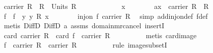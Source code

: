 \begin{isabellebody}
\ {\isachardoublequoteopen}carrier\ R\ {\isacharminus}{\kern0pt}\ {\isacharbraceleft}{\kern0pt}{\isasymzero}\isactrlbsub R\isactrlesub {\isacharbraceright}{\kern0pt}\ {\isasymsubseteq}\ Units\ R{\isachardoublequoteclose}\isanewline
\ \ \ \ \isamarkupfalse%
\isanewline
\ \ \ \ \ \ \isamarkupfalse%
\ x\isanewline
\ \ \ \ \ \ \isamarkupfalse%
\ a{\isacharcolon}{\kern0pt}{\isachardoublequoteopen}x\ {\isasymin}\ carrier\ R\ {\isacharminus}{\kern0pt}\ {\isacharbraceleft}{\kern0pt}{\isasymzero}\isactrlbsub R\isactrlesub {\isacharbraceright}{\kern0pt}{\isachardoublequoteclose}\isanewline
\ \ \ \ \ \ \isamarkupfalse%
\ f\ \ {\isachardoublequoteopen}f\ {\isacharequal}{\kern0pt}\ {\isacharparenleft}{\kern0pt}{\isasymlambda}y{\isachardot}{\kern0pt}\ y\ {\isasymotimes}\isactrlbsub R\isactrlesub \ x{\isacharparenright}{\kern0pt}{\isachardoublequoteclose}\isanewline
\ \ \ \ \ \ \isamarkupfalse%
\ {\isachardoublequoteopen}inj{\isacharunderscore}{\kern0pt}on\ f\ {\isacharparenleft}{\kern0pt}carrier\ R{\isacharparenright}{\kern0pt}{\isachardoublequoteclose}\ \isamarkupfalse%
\ {\isacharparenleft}{\kern0pt}simp\ add{\isacharcolon}{\kern0pt}inj{\isacharunderscore}{\kern0pt}on{\isacharunderscore}{\kern0pt}def\ f{\isacharunderscore}{\kern0pt}def{\isacharparenright}{\kern0pt}\isanewline
\ \ \ \ \ \ \ \ \isamarkupfalse%
\ {\isacharparenleft}{\kern0pt}metis\ DiffD{}\ DiffD{}\ a\ assms{\isacharparenleft}{\kern0pt}{}{\isacharparenright}{\kern0pt}\ domain{\isachardot}{\kern0pt}m{\isacharunderscore}{\kern0pt}rcancel\ insertI{}{\isacharparenright}{\kern0pt}\isanewline
\ \ \ \ \ \ \isamarkupfalse%
\ {\isachardoublequoteopen}card\ {\isacharparenleft}{\kern0pt}carrier\ R{\isacharparenright}{\kern0pt}\ {\isacharequal}{\kern0pt}\ card\ {\isacharparenleft}{\kern0pt}f\ {\isacharbackquote}{\kern0pt}\ carrier\ R{\isacharparenright}{\kern0pt}{\isachardoublequoteclose}\isanewline
\ \ \ \ \ \ \ \ \isamarkupfalse%
\ {\isacharparenleft}{\kern0pt}metis\ card{\isacharunderscore}{\kern0pt}image{\isacharparenright}{\kern0pt}\isanewline
\ \ \ \ \ \ \isamarkupfalse%
\ \isamarkupfalse%
\ {\isachardoublequoteopen}f\ {\isacharbackquote}{\kern0pt}\ carrier\ R\ {\isasymsubseteq}\ carrier\ R{\isachardoublequoteclose}\isanewline
\ \ \ \ \ \ \ \ \isamarkupfalse%
\ {\isacharparenleft}{\kern0pt}rule\ image{\isacharunderscore}{\kern0pt}subsetI{\isacharparenright}{\kern0pt}\ \isamarkupfalse%

\end{isabellebody}
